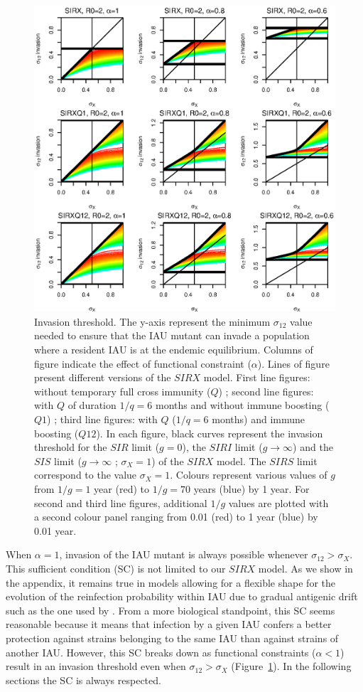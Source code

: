 \begin{figure}[!htbp]
  \center
  \includegraphics[width=0.8\linewidth]{texte/article3/graph/thresholdn1x_alpha_r02.eps}
  \caption{Invasion threshold. The y-axis represent the minimum
    $\sigma_{12}$ value needed to ensure that the IAU mutant can
    invade a population where a resident IAU is at the endemic
    equilibrium. Columns of figure indicate the effect of functional
    constraint ($\alpha$). Lines of figure present different versions
    of the $SIRX$ model. First line figures: without temporary full
    cross immunity ($Q$) ; second line figures: with $Q$ of duration
    $1/q=6$ months and without immune boosting ($Q1$) ; third line
    figures: with $Q$ ($1/q=6$ months) and immune boosting ($Q12$). In
    each figure, black curves represent the invasion threshold for the
    $SIR$ limit ($g=0$), the $SIRI$ limit ($g \to \infty$) and the
    $SIS$ limit ($g \to \infty$ ; $\sigma_{X}=1$) of the $SIRX$
    model. The $SIRS$ limit correspond to the value
    $\sigma_{X}=1$. Colours represent various values of $g$ from
    $1/g=1$ year (red) to $1/g=70$ years (blue) by 1 year. For second
    and third line figures, additional $1/g$ values are plotted with a
    second colour panel ranging from 0.01 (red) to 1 year (blue) by
    0.01 year.}
  \label{fig:threshold}
\end{figure}


When $\alpha=1$, invasion of the IAU mutant is always possible
whenever $\sigma_{12} > \sigma_{X}$. This sufficient condition (SC) is
not limited to our $SIRX$ model. As we show in the appendix, it
remains true in models allowing for a flexible shape for the evolution
of the reinfection probability within IAU due to gradual antigenic
drift such as the one used by \citet{Xia2005}. From a more biological
standpoint, this SC seems reasonable because it means that infection
by a given IAU confers a better protection against strains belonging
to the same IAU than against strains of another IAU. However, this SC
breaks down as functional constraints ($\alpha<1$) result in an
invasion threshold even when $\sigma_{12} > \sigma_{X}$
(Figure~\ref{fig:threshold}). In the following sections the SC is
always respected.




